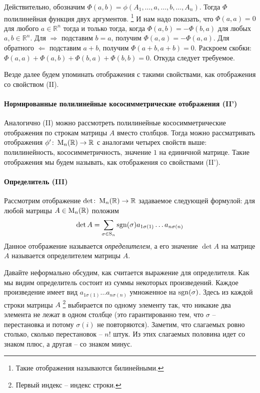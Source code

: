 Действительно, обозначим $\Phi(a,b) = \phi(A_1,\ldots, a, \ldots, b, \ldots, A_n)$.
Тогда $\Phi$ полилинейная функция двух аргументов.%
\footnote{Такие отображения называются билинейными.}
И нам надо показать, что $\Phi(a,a) = 0$ для любого $a\in \mathbb R^n$ тогда и только тогда, когда $\Phi(a,b) = -\Phi(b,a)$ для любых $a,b\in\mathbb R^n$.
Для $\Rightarrow$ подставим $b = a$, получим $\Phi(a,a) = -\Phi(a,a)$.
Для обратного $\Leftarrow$ подставим $a+b$, получим $\Phi(a+b, a+b) = 0$.
Раскроем скобки: $\Phi(a,a) + \Phi(a,b) + \Phi(b,a) + \Phi(b,b) = 0$.
Откуда следует требуемое.

Везде далее будем упоминать отображения с такими свойствами, как отображения со свойством (II).

\paragraph{Нормированные полилинейные кососимметрические отображения (II')}

Аналогично (II) можно рассмотреть полилинейные кососимметрические отображения по строкам матрицы $A$ вместо столбцов.
Тогда можно рассматривать отображения $\phi'\colon \operatorname{M}_{n}(\mathbb R)\to \mathbb R$ с аналогами четырех свойств выше: полилинейность, кососимметричность, значение $1$ на единичной матрице.
Такие отображения мы будем называть, как отображения со свойствами (II').

\paragraph{Определитель (III)}

Рассмотрим отображение $\det \colon \operatorname{M}_{n}(\mathbb R)\to \mathbb R$ задаваемое следующей формулой: для любой матрицы $A\in\operatorname{M}_{n}(\mathbb R)$ положим
\[
\det A = \sum_{\sigma \in \operatorname{S}_{n}} \operatorname{sgn}(\sigma) a_{1\sigma(1)}\ldots a_{n\sigma(n)}
\]
Данное отображение называется {\it определителем}, а его значение $\det A$ на матрице $A$ называется определителем матрицы $A$.

Давайте неформально обсудим, как считается выражение для определителя.
Как мы видим определитель состоит из суммы некоторых произведений.
Каждое произведение имеет вид $a_{1\sigma(1)}\ldots a_{n\sigma(n)}$ умноженное на $\operatorname{sgn}(\sigma)$.
Здесь из каждой строки матрицы $A$%
\footnote{Первый индекс -- индекс строки.}
выбирается по одному элементу так, что никакие два элемента не лежат в одном столбце (это гарантированно тем, что $\sigma$ -- перестановка и потому $\sigma(i)$ не повторяются).
Заметим, что слагаемых ровно столько, сколько перестановок -- $n!$ штук.
Из этих слагаемых половина идет со знаком плюс, а другая -- со знаком минус.

